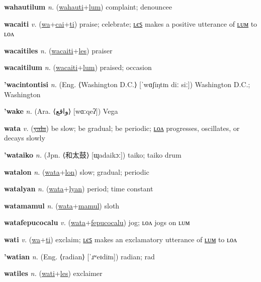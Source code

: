 \textbf{\hypertarget{wahautilum}{wahautilum}} \textit{n.} (\hyperlink{wahauti}{wahauti}+\allowbreak \hyperlink{lum}{lum})
complaint; denouncee

\textbf{\hypertarget{wacaiti}{wacaiti}} \textit{v.} (\hyperlink{wa}{wa}+\allowbreak \hyperlink{cai}{cai}+\allowbreak \hyperlink{ti}{ti})
praise; celebrate; \hyperlink{wacaitiles}{ʟєꜱ} makes a positive utterance of \hyperlink{wacaitilum}{ʟᴜᴍ} to ʟᴏᴧ

\textbf{\hypertarget{wacaitiles}{wacaitiles}} \textit{n.} (\hyperlink{wacaiti}{wacaiti}+\allowbreak \hyperlink{les}{les})
praiser

\textbf{\hypertarget{wacaitilum}{wacaitilum}} \textit{n.} (\hyperlink{wacaiti}{wacaiti}+\allowbreak \hyperlink{lum}{lum})
praised; occasion

\textbf{\hypertarget{'wacintontisi}{'wacintontisi}} \textit{n.} (Eng. ⟨Washington D.C.⟩ [ˈwɑʃiŋtɪn diː siː])
Washington D.C.; Washington

\textbf{\hypertarget{'wake}{'wake}} \textit{n.} (Ara. ⟨{\arabics{}واقع‎}⟩ [wɑːqeʔ])
Vega

\textbf{\hypertarget{wata}{wata}} \textit{v.} (\hyperlink{yala}{\sout{yala}})
be slow; be gradual; be periodic; \hyperlink{watalon}{ʟᴏᴧ} progresses, oscillates, or decays slowly

\textbf{\hypertarget{'wataiko}{'wataiko}} \textit{n.} (Jpn. ⟨{\japanese{}和太鼓}⟩ [ɰadaikɔː])
taiko; taiko drum

\textbf{\hypertarget{watalon}{watalon}} \textit{n.} (\hyperlink{wata}{wata}+\allowbreak \hyperlink{lon}{lon})
slow; gradual; periodic

\textbf{\hypertarget{watalyan}{watalyan}} \textit{n.} (\hyperlink{wata}{wata}+\allowbreak \hyperlink{lyan}{lyan})
period; time constant

\textbf{\hypertarget{watamamul}{watamamul}} \textit{n.} (\hyperlink{wata}{wata}+\allowbreak \hyperlink{mamul}{mamul})
sloth

\textbf{\hypertarget{watafepucocalu}{watafepucocalu}} \textit{v.} (\hyperlink{wata}{wata}+\allowbreak \hyperlink{fepucocalu}{fepucocalu})
jog; ʟᴏᴧ jogs on ʟᴜᴍ

\textbf{\hypertarget{wati}{wati}} \textit{v.} (\hyperlink{wa}{wa}+\allowbreak \hyperlink{ti}{ti})
exclaim; \hyperlink{watiles}{ʟєꜱ} makes an exclamatory utterance of \hyperlink{watilum}{ʟᴜᴍ} to ʟᴏᴧ

\textbf{\hypertarget{'watian}{'watian}} \textit{n.} (Eng. ⟨radian⟩ [ˈɹʷeɪdiɪn])
radian; rad

\textbf{\hypertarget{watiles}{watiles}} \textit{n.} (\hyperlink{wati}{wati}+\allowbreak \hyperlink{les}{les})
exclaimer

